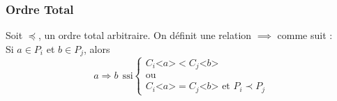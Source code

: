\documentclass[compress]{beamer}
\begin{document}
\begin{frame}
\frametitle{Ordre Total}
Soit $\preceq$, un ordre total arbitraire. On définit une relation $\implies$ comme suit :\\
Si $a \in P_i$ et $b \in P_j$, alors \\
\[
	a \Rightarrow b \ \ \text{ssi}
	\begin{cases}
		C_i \text{<}a\text{>} < C_j\text{<}b\text{>} \\
		\text{ou}\\
		C_i\text{<}a\text{>} = C_j\text{<}b\text{>} \text{ et } P_i \prec P_j
	\end{cases}
\]
\end{frame}
\end{document}
